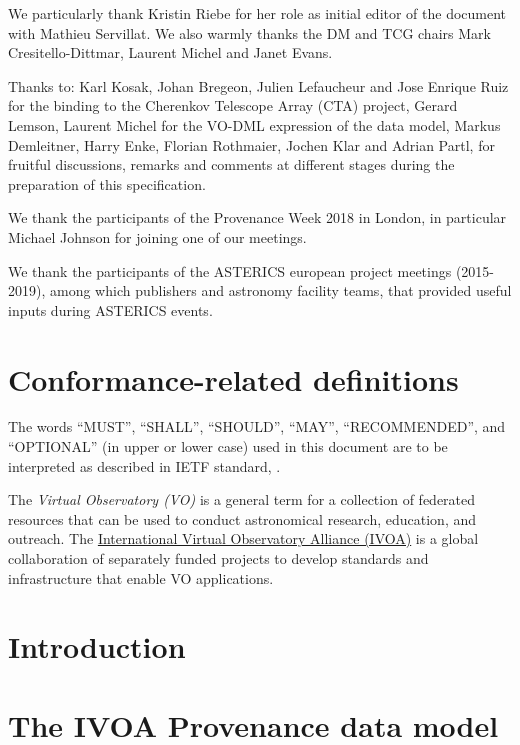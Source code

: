 \documentclass[11pt,a4paper]{ivoa}
\begin{document}
We particularly thank Kristin Riebe for her role as initial editor of the document with Mathieu Servillat. We also warmly thanks the DM and TCG chairs Mark Cresitello-Dittmar, Laurent Michel and Janet Evans.

Thanks to: Karl Kosak, Johan Bregeon, Julien Lefaucheur and Jose Enrique Ruiz for the binding to the Cherenkov Telescope Array (CTA) project, Gerard Lemson, Laurent Michel for the VO-DML expression of the data model, Markus Demleitner, Harry Enke, Florian Rothmaier, Jochen Klar and Adrian Partl, for fruitful discussions, remarks and comments at different stages during the preparation of this specification.

We thank the participants of the Provenance Week 2018 in London, in particular Michael Johnson for joining one of our meetings.

We thank the participants of the ASTERICS european project meetings (2015-2019), among which publishers and astronomy facility teams, that provided useful inputs during ASTERICS events.


\section*{Conformance-related definitions}

The words ``MUST'', ``SHALL'', ``SHOULD'', ``MAY'', ``RECOMMENDED'', and
``OPTIONAL'' (in upper or lower case) used in this document are to be
interpreted as described in IETF standard, \citet{std:RFC2119}.

The \emph{Virtual Observatory (VO)} is
a general term for a collection of federated resources that can be used
to conduct astronomical research, education, and outreach.
The \href{http://www.ivoa.net}{International
Virtual Observatory Alliance (IVOA)} is a global
collaboration of separately funded projects to develop standards and
infrastructure that enable VO applications.

\section{Introduction}
\label{sec:intro}





\clearpage
\section{The IVOA Provenance data model}
\label{sec:datamodel}

\end{document}
